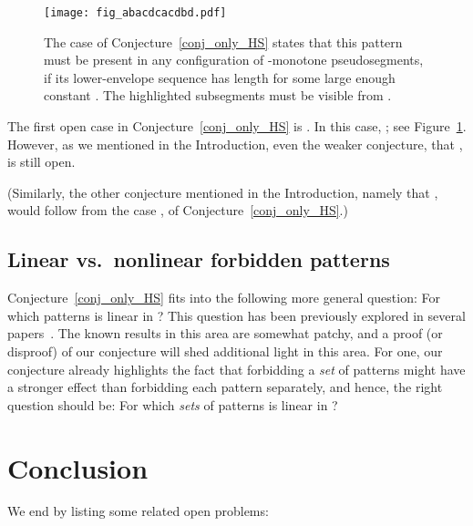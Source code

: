 \documentclass[11pt]{article}
\theoremstyle{definition}
\theoremstyle{remark}
\begin{document}
\begin{figure}
\centerline{\texttt{[image: fig\_abacdcacdbd.pdf]}}
\caption{\label{fig_abacdcacdbd} The case  of Conjecture~\ref{conj_only_HS} states that this pattern must be present in any configuration of  -monotone pseudosegments, if its lower-envelope sequence has length  for some large enough constant . The highlighted subsegments must be visible from .}
\end{figure}

The first open case in Conjecture~\ref{conj_only_HS} is . In this case, ; see Figure~\ref{fig_abacdcacdbd}. However, as we mentioned in the Introduction, even the weaker conjecture, that , is still open.

(Similarly, the other conjecture mentioned in the Introduction, namely that , would follow from the case ,  of Conjecture~\ref{conj_only_HS}.)

\subsection{Linear vs.~nonlinear forbidden patterns}

Conjecture~\ref{conj_only_HS} fits into the following more general question: For which patterns  is  linear in ? This question has been previously explored in several papers~\cite{AKV,klazar_93,klazar_survey,pettie_forbid,pettie_origins}. The known results in this area are somewhat patchy, and a proof (or disproof) of our conjecture will shed additional light in this area. For one, our conjecture already highlights the fact that forbidding a \emph{set} of patterns might have a stronger effect than forbidding each pattern separately, and hence, the right question should be: For which \emph{sets} of patterns  is  linear in ?

\section{Conclusion}\label{sec_discussion}

We end by listing some related open problems:
\end{document}
